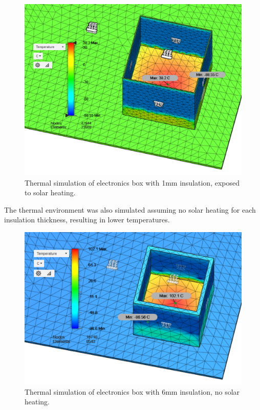 	\begin{figure}[h!]
    \centering  
    \includegraphics[scale=0.65]{4-experiment-design/img/mechanical/1mmthickheat.PNG}
	\caption{Thermal simulation of electronics box with 1mm insulation, exposed to solar heating.}
	\label{fig:1mmthickheat}    
    	\end{figure}
    	
The thermal environment was also simulated assuming no solar heating for each insulation thickness, resulting in lower temperatures. \\

	\begin{figure}[h!]
    \centering	
	\includegraphics[scale=0.58]{4-experiment-design/img/mechanical/6mmthicknoheat.PNG}
	\caption{Thermal simulation of electronics box with 6mm insulation, no solar heating.}
	\label{fig:6mmthicknoheat}
    	\end{figure}

